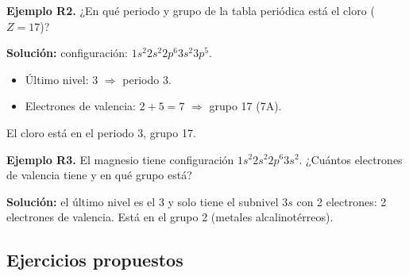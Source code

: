 \documentclass[12pt, letterpaper]{article}
\begin{document}
\textbf{Ejemplo R2.} ¿En qué periodo y grupo de la tabla periódica está el cloro ($Z = 17$)?

\begin{cuadrosolucion}
  \textbf{Solución:} configuración: $1s^{2}2s^{2}2p^{6}3s^{2}3p^{5}$.
  \begin{itemize}
    \item Último nivel: $3$ $\Rightarrow$ periodo 3.
    \item Electrones de valencia: $2 + 5 = 7$ $\Rightarrow$ grupo 17 (7A).
  \end{itemize}
  El cloro está en el periodo 3, grupo 17.
\end{cuadrosolucion}

\textbf{Ejemplo R3.} El magnesio tiene configuración $1s^{2}2s^{2}2p^{6}3s^{2}$. ¿Cuántos electrones de valencia tiene y en qué grupo está?

\begin{cuadrosolucion}
  \textbf{Solución:} el último nivel es el 3 y solo tiene el subnivel $3s$ con 2 electrones: 2 electrones de valencia. Está en el grupo 2 (metales alcalinotérreos).
\end{cuadrosolucion}

\newpage %

\subsection{Ejercicios propuestos}
\end{document}
